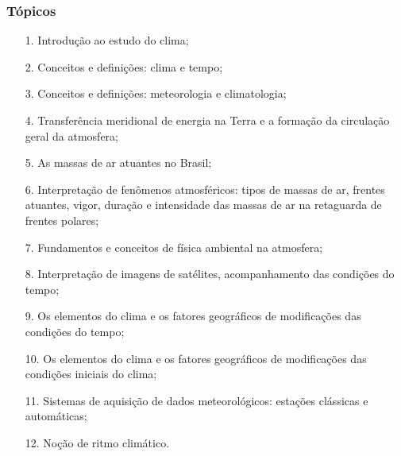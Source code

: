 \begin{frame}
  \frametitle{Tópicos}
  {\scriptsize
  \begin{block}{}
  \begin{itemize}
  \item[1.] Introdução ao estudo do clima;
  \item[2.] Conceitos e definições: clima e tempo;
  \item[3.] Conceitos e definições: meteorologia e climatologia;
  \item[4.] Transferência meridional de energia na Terra e a formação da
            circulação geral da atmosfera;
  \item[5.] As massas de ar atuantes no Brasil;
  \item[6.] Interpretação de fenômenos atmosféricos: tipos de massas de ar,
            frentes atuantes, vigor, duração e intensidade das massas de ar na
            retaguarda de frentes polares;
  \item[7.] Fundamentos e conceitos de física ambiental na atmosfera;
  \item[8.] Interpretação de imagens de satélites, acompanhamento das condições
            do tempo;
  \item[9.] Os elementos do clima e os fatores geográficos de modificações das
            condições do tempo;
  \item[10.] Os elementos do clima e os fatores geográficos de modificações das
             condições iniciais do clima;
  \item[11.] Sistemas de aquisição de dados meteorológicos: estações clássicas
             e automáticas;
  \item[12.] Noção de ritmo climático.
  \end{itemize}
  \end{block}
  }
\end{frame}

